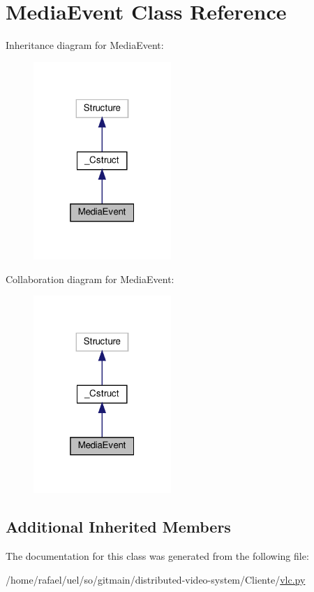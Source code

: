 \hypertarget{classvlc_1_1_media_event}{}\section{Media\+Event Class Reference}
\label{classvlc_1_1_media_event}


Inheritance diagram for Media\+Event\+:
\nopagebreak
\begin{figure}[H]
\begin{center}
\leavevmode
\includegraphics[width=148pt]{classvlc_1_1_media_event__inherit__graph}
\end{center}
\end{figure}


Collaboration diagram for Media\+Event\+:
\nopagebreak
\begin{figure}[H]
\begin{center}
\leavevmode
\includegraphics[width=148pt]{classvlc_1_1_media_event__coll__graph}
\end{center}
\end{figure}
\subsection*{Additional Inherited Members}


The documentation for this class was generated from the following file\+:\begin{DoxyCompactItemize}
\item 
/home/rafael/uel/so/gitmain/distributed-\/video-\/system/\+Cliente/\hyperlink{vlc_8py}{vlc.\+py}\end{DoxyCompactItemize}
